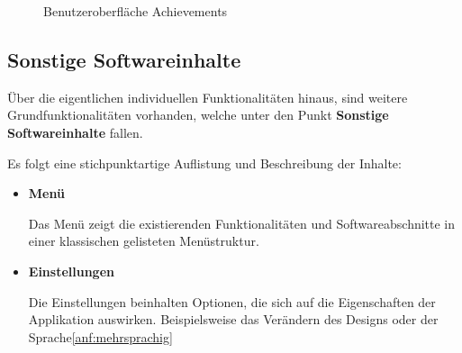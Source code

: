 \documentclass{scrreprt}
\begin{document}
\begin{figure}[H]
\centering
	\caption{Benutzeroberfläche Achievements}
	\label{img:achievements}
\end{figure}

\newpage
\subsection{Sonstige Softwareinhalte}
\par Über die eigentlichen individuellen Funktionalitäten hinaus, sind weitere Grundfunktionalitäten vorhanden, welche unter den Punkt \textbf{Sonstige Softwareinhalte} fallen.

\par\medskip Es folgt eine stichpunktartige Auflistung und Beschreibung der Inhalte:
\begin{itemize}
\item \textbf{Menü}
\par Das Menü zeigt die existierenden Funktionalitäten und Softwareabschnitte in einer klassischen gelisteten Menüstruktur.
\item \textbf{Einstellungen}
\par Die Einstellungen beinhalten Optionen, die sich auf die Eigenschaften der Applikation auswirken. Beispielsweise das Verändern des Designs oder der Sprache\ref{anf:mehrsprachig}
\end{itemize}
\end{document}
